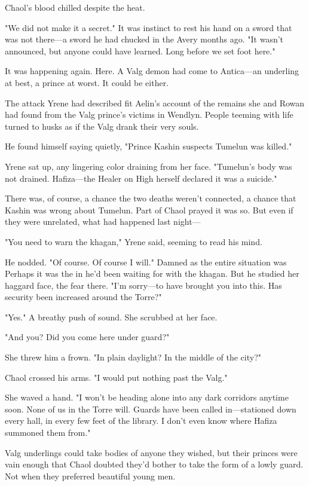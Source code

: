 Chaol's blood chilled despite the heat.

"We did not make it a secret." It was instinct to rest his hand on a sword that was not there---a sword he had chucked in the Avery months ago. "It wasn't announced, but anyone could have learned. Long before we set foot here."

It was happening again. Here. A Valg demon had come to Antica---an underling at best, a prince at worst. It could be either.

The attack Yrene had described fit Aelin's account of the remains she and Rowan had found from the Valg prince's victims in Wendlyn. People teeming with life turned to husks as if the Valg drank their very souls.

He found himself saying quietly, "Prince Kashin suspects Tumelun was killed."

Yrene sat up, any lingering color draining from her face. "Tumelun's body was not drained. Hafiza---the Healer on High herself declared it was a suicide."

There was, of course, a chance the two deaths weren't connected, a chance that Kashin was wrong about Tumelun. Part of Chaol prayed it was so. But even if they were unrelated, what had happened last night---

"You need to warn the khagan," Yrene said, seeming to read his mind.

He nodded. "Of course. Of course I will." Damned as the entire situation was  Perhaps it was the in he'd been waiting for with the khagan. But he studied her haggard face, the fear there. "I'm sorry---to have brought you into this. Has security been increased around the Torre?"

"Yes." A breathy push of sound. She scrubbed at her face.

"And you? Did you come here under guard?"

She threw him a frown. "In plain daylight? In the middle of the city?"

Chaol crossed his arms. "I would put nothing past the Valg."

She waved a hand. "I won't be heading alone into any dark corridors anytime soon. None of us in the Torre will. Guards have been called in---stationed down every hall, in every few feet of the library. I don't even know where Hafiza summoned them from."

Valg underlings could take bodies of anyone they wished, but their princes were vain enough that Chaol doubted they'd bother to take the form of a lowly guard. Not when they preferred beautiful young men.

